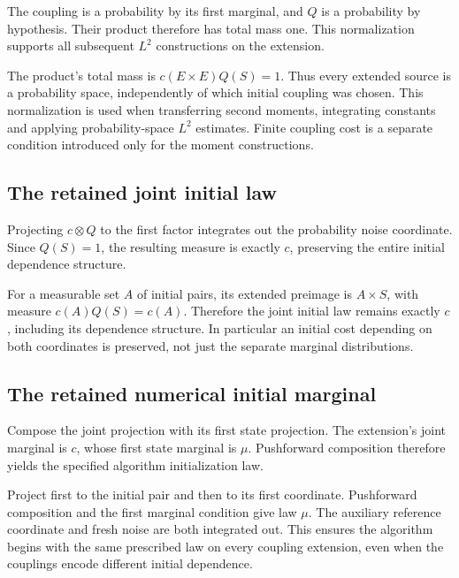 \documentclass[11pt,a4paper]{article}
\begin{document}
The coupling is a probability by its first marginal, and \(Q\) is a probability by hypothesis. Their product therefore has total mass one. This normalization supports all subsequent \(L^2\) constructions on the extension.



The product's total mass is \(c(E\times E)Q(S)=1\). Thus every extended source is a probability space, independently of which initial coupling was chosen. This normalization is used when transferring second moments, integrating constants and applying probability-space \(L^2\) estimates. Finite coupling cost is a separate condition introduced only for the moment constructions.


\subsection{\texorpdfstring{The retained joint initial law}{The retained joint initial law}}


Projecting \(c\otimes Q\) to the first factor integrates out the probability noise coordinate. Since \(Q(S)=1\), the resulting measure is exactly \(c\), preserving the entire initial dependence structure.



For a measurable set \(A\) of initial pairs, its extended preimage is \(A\times S\), with measure \(c(A)Q(S)=c(A)\). Therefore the joint initial law remains exactly \(c\), including its dependence structure. In particular an initial cost depending on both coordinates is preserved, not just the separate marginal distributions.


\subsection{\texorpdfstring{The retained numerical initial marginal}{The retained numerical initial marginal}}


Compose the joint projection with its first state projection. The extension's joint marginal is \(c\), whose first state marginal is \(\mu\). Pushforward composition therefore yields the specified algorithm initialization law.



Project first to the initial pair and then to its first coordinate. Pushforward composition and the first marginal condition give law \(\mu\). The auxiliary reference coordinate and fresh noise are both integrated out. This ensures the algorithm begins with the same prescribed law on every coupling extension, even when the couplings encode different initial dependence.
\end{document}
